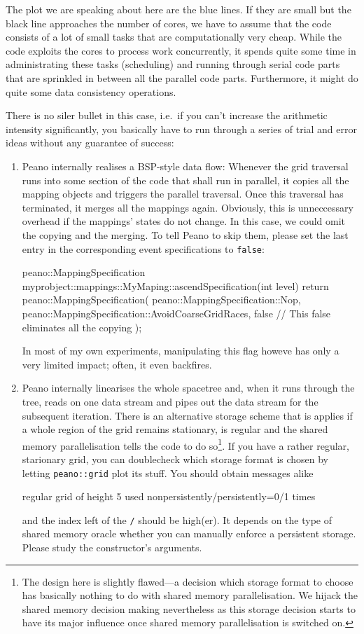\noindent
The plot we are speaking about here are the blue lines. If they are small but
the black line approaches the number of cores, we have to assume that the code
consists of a lot of small tasks that are computationally very cheap.
While the code exploits the cores to process work concurrently, it spends quite
some time in administrating these tasks (scheduling) and running through serial
code parts that are sprinkled in between all the parallel code parts.
Furthermore, it might do quite some data consistency operations.


There is no siler bullet in this case, i.e.~if you can't increase the arithmetic
intensity significantly, you basically have to run through a series of trial and
error ideas without any guarantee of success:

\begin{enumerate}
  \item Peano internally realises a BSP-style data flow: Whenever the grid
  traversal runs into some section of the code that shall run in parallel, it
  copies all the mapping objects and triggers the parallel traversal. Once this
  traversal has terminated, it merges all the mappings again. Obviously, this is
  unneccessary overhead if the mappings' states do not change. In this case, we
  could omit the copying and the merging. To tell Peano to skip them, please set
  the last entry in the corresponding event specifications to \texttt{false}:
  \begin{code}
peano::MappingSpecification  
myprobject::mappings::MyMaping::ascendSpecification(int level) { 
 return peano::MappingSpecification(
  peano::MappingSpecification::Nop,
  peano::MappingSpecification::AvoidCoarseGridRaces,
  false // This false eliminates all the copying 
 );
}
  \end{code}
  In most of my own experiments, manipulating this flag howeve has only a very
  limited impact; often, it even backfires.
  \item Peano internally linearises the whole spacetree and, when it runs
  through the tree, reads on one data stream and pipes out the data stream for
  the subsequent iteration. There is an alternative storage scheme that is
  applies if a whole region of the grid remains stationary, is regular and the
  shared memory parallelisation tells the code to do so\footnote{The  design
  here is slightly flawed---a decision which storage format to choose has
  basically nothing to do with shared memory parallelisation. We hijack the
  shared memory decision making nevertheless as this storage decision starts to
  have its major influence once shared memory parallelisation is switched on.}.
  If you have a rather regular, starionary grid, you can doublecheck which
  storage format is chosen by letting \texttt{peano::grid} plot its stuff. You
  should obtain messages alike
  \begin{code}
  regular grid of height 5 used nonpersistently/persistently=0/1 times
  \end{code}
  and the index left of the \texttt{/} should be high(er). It depends on the
  type of shared memory oracle whether you can manually enforce a persistent
  storage. Please study the constructor's arguments.
\end{enumerate}


